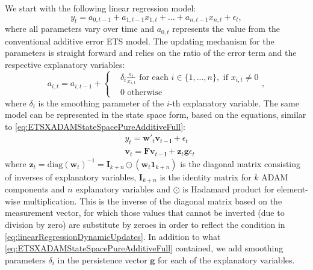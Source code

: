 \documentclass[
]{book}
\theoremstyle{definition}
\theoremstyle{definition}
\theoremstyle{definition}
\theoremstyle{definition}
\theoremstyle{remark}
\begin{document}
We start with the following linear regression model:
\begin{equation}
    y_{t} = a_{0,t-1} + a_{1,t-1} x_{1,t} + \dots + a_{n,t-1} x_{n,t} + \epsilon_t ,
  \label{eq:linearRegressionDynamic}
\end{equation}
where all parameters vary over time and \(a_{0,t}\) represents the value from the conventional additive error ETS model. The updating mechanism for the parameters is straight forward and relies on the ratio of the error term and the respective explanatory variables:
\begin{equation}
    a_{i,t} = a_{i,t-1} + \left \lbrace \begin{aligned}
                  &\delta_i \frac{\epsilon_t}{x_{i,t}} \text{ for each } i \in \{1, \dots, n\}, \text{ if } x_{i,t}\neq 0 \\
                  &0 \text{ otherwise }
            \end{aligned} \right. ,
  \label{eq:linearRegressionDynamicUpdates}
\end{equation}
where \(\delta_i\) is the smoothing parameter of the \(i\)-th explanatory variable. The same model can be represented in the state space form, based on the equations, similar to \eqref{eq:ETSXADAMStateSpacePureAdditiveFull}:
\begin{equation}
  \begin{aligned}
    & {y}_{t} = \mathbf{w}'_t \mathbf{v}_{t-\mathbf{l}} + \epsilon_t \\
    & \mathbf{v}_t = \mathbf{F} \mathbf{v}_{t-\mathbf{l}} + \mathbf{z}_t \mathbf{g} \epsilon_t
  \end{aligned}
  \label{eq:ADAMETSXPureAdditiveDynamicFull}
\end{equation}
where \(\mathbf{z}_t = \mathrm{diag}\left(\mathbf{w}_t\right)^{-1}=\mathbf{I}_{k+n} \odot (\mathbf{w}_t \mathbf{1}_{k+n})\) is the diagonal matrix consisting of inverses of explanatory variables, \(\mathbf{I}_{k+n}\) is the identity matrix for \(k\) ADAM components and \(n\) explanatory variables and \(\odot\) is Hadamard product for element-wise multiplication. This is the inverse of the diagonal matrix based on the measurement vector, for which those values that cannot be inverted (due to division by zero) are substitute by zeroes in order to reflect the condition in \eqref{eq:linearRegressionDynamicUpdates}. In addition to what \eqref{eq:ETSXADAMStateSpacePureAdditiveFull} contained, we add smoothing parameters \(\delta_i\) in the persistence vector \(\mathbf{g}\) for each of the explanatory variables.
\end{document}
